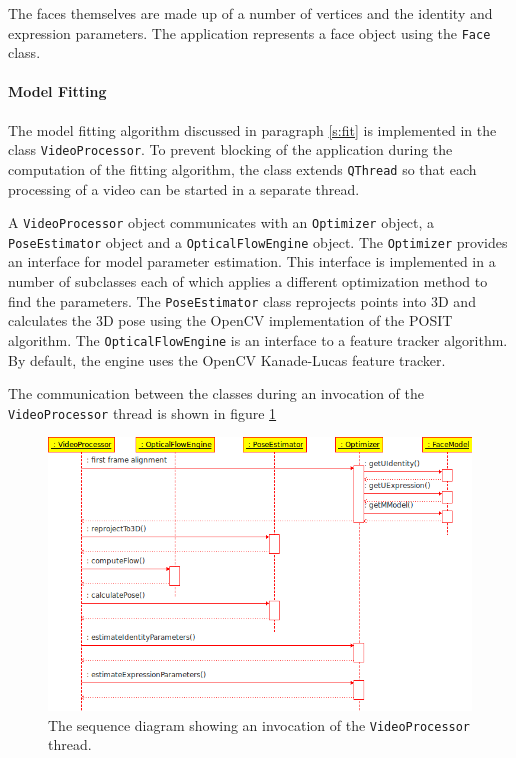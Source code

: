 \documentclass[11pt,a4paper,twoside]{report}
\begin{document}
The faces themselves are made up of a number of vertices and the identity and
expression parameters. The application represents a face object using the
\texttt{Face} class.
\paragraph{Model Fitting}
The model fitting algorithm discussed in paragraph \ref{s:fit} is implemented in
the class \texttt{VideoProcessor}. To prevent blocking of the application during the
computation of the fitting algorithm, the class extends \texttt{QThread} so that
each processing of a video can be started in a separate thread.

A \texttt{VideoProcessor} object communicates with an \texttt{Optimizer} object,
a \texttt{PoseEstimator} object and a \texttt{OpticalFlowEngine} object. The
\texttt{Optimizer} provides an interface for model parameter estimation. This
interface is implemented in a number of subclasses each of which applies a
different optimization method to find the parameters. The \texttt{PoseEstimator}
class reprojects points into 3D and calculates the 3D pose using the OpenCV
implementation of the POSIT algorithm. The \texttt{OpticalFlowEngine} is an
interface to a feature tracker algorithm. By default, the engine uses the OpenCV
Kanade-Lucas feature tracker.

The communication between the classes during an invocation of the
\texttt{VideoProcessor} thread is shown in figure \ref{fg:videoproc}

\begin{figure}[H]
\begin{centering}
\includegraphics[scale=0.71]{images/videoproc.png}
\par\end{centering}

\caption{The sequence diagram showing an invocation of the
  \texttt{VideoProcessor} thread.}
\label{fg:videoproc}
\end{figure}
\end{document}
